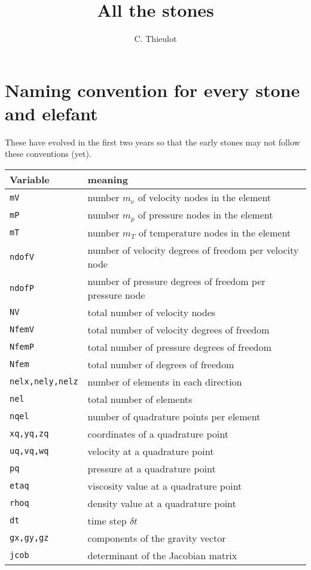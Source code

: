 \documentclass[a4paper,11pt]{report}
\author{C. Thieulot}
\title{All the stones}
\begin{document}
\maketitle
\tableofcontents



\chapter*{Naming convention for every stone and elefant }

These have evolved in the first two years so that the early stones may not 
follow these conventions (yet).

\begin{tabular}{p{2.5cm}p{14cm}}
\hline
Variable & meaning \\
\hline
\hline
{\tt mV}    & number $m_\upnu$ of velocity nodes in the element \\
{\tt mP}    & number $m_p$ of pressure nodes in the element \\
{\tt mT}    & number $m_T$ of temperature nodes in the element \\
{\tt ndofV} & number of velocity degrees of freedom per velocity node \\
{\tt ndofP} & number of pressure degrees of freedom per pressure node \\
{\tt NV}    & total number of velocity nodes \\
{\tt NfemV} & total number of velocity degrees of freedom \\
{\tt NfemP} & total number of pressure degrees of freedom \\
{\tt Nfem}  & total number of degrees of freedom \\
{\tt nelx,nely,nelz} & number of elements in each direction \\
{\tt nel}   & total number of elements \\
{\tt nqel}  & number of quadrature points per element \\
{\tt xq,yq,zq} & coordinates of a quadrature point \\
{\tt uq,vq,wq} & velocity at a quadrature point \\
{\tt pq}   & pressure at a quadrature point \\
{\tt etaq} & viscosity value at a quadrature point \\
{\tt rhoq} & density value at a quadrature point \\
{\tt dt}   & time step $\delta t$\\ 
{\tt gx,gy,gz} & components of the gravity vector \\
{\tt jcob} & determinant of the Jacobian matrix \\
\hline
\end{tabular}
\end{document}
